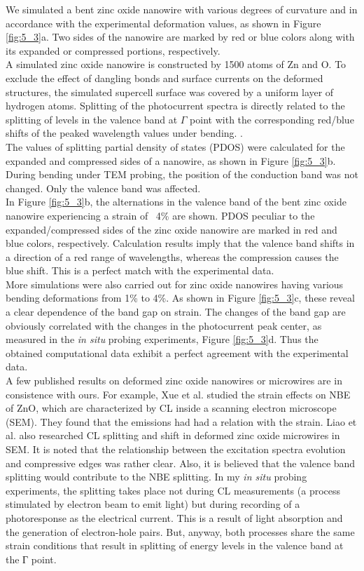 We simulated a bent zinc oxide nanowire with various degrees of curvature and in accordance with the experimental deformation values, as shown in Figure \ref{fig:5_3}a.
Two sides of the nanowire are marked by red or blue colors along with its expanded or compressed portions, respectively. \\
A simulated zinc oxide nanowire is constructed by 1500 atoms of Zn and O. 
To exclude the effect of dangling bonds and surface currents on the deformed structures, the simulated supercell surface was covered by a uniform layer of hydrogen atoms. 
Splitting of the photocurrent spectra is directly related to the splitting of levels in the valence band at $\Gamma$ point with the corresponding red/blue shifts of the peaked wavelength values under bending. .\cite{Liao2012} \\
The values of splitting partial density of states (PDOS) were calculated for the expanded and compressed sides of a nanowire, as shown in Figure \ref{fig:5_3}b. 
During bending under TEM probing, the position of the conduction band was not changed. 
Only the valence band was affected. \\
In Figure \ref{fig:5_3}b, the alternations in the valence band of the bent zinc oxide nanowire experiencing a strain of ~4\% are shown. 
PDOS peculiar to the expanded/compressed sides of the zinc oxide nanowire are marked in red and blue colors, respectively. 
Calculation results imply that the valence band shifts in a direction of a red range of wavelengths, whereas the compression causes the blue shift. 
This is a perfect match with the experimental data. \\
More simulations were also carried out for zinc oxide nanowires having various bending deformations from 1\% to 4\%. 
As shown in Figure \ref{fig:5_3}c, these reveal a clear dependence of the band gap on strain.  
The changes of the band gap are obviously correlated with the changes in the photocurrent peak center, as measured in the {\em in situ} probing experiments, Figure \ref{fig:5_3}d. 
Thus the obtained computational data exhibit a perfect agreement with the experimental data. \\

A few published results on deformed zinc oxide nanowires or microwires are in consistence with ours. 
For example, Xue et al. studied the strain effects on NBE of ZnO, which are characterized by CL inside a scanning electron microscope (SEM). They found that the emissions had had a relation with the strain.\cite{G.2010}
Liao et al. also researched CL splitting and shift in deformed zinc oxide microwires in SEM. It is noted that the relationship between the excitation spectra evolution and compressive edges was rather clear. Also, it is believed that the valence band splitting would contribute to the NBE splitting.\cite{Moreira2009} 
In my {\em in situ} probing experiments, the splitting takes place not during CL measurements (a process stimulated by electron beam to emit light) but during recording of a photoresponse as the electrical current. 
This is a result of light absorption and the generation of electron-hole pairs.
But, anyway, both processes share the same strain conditions that result in splitting of energy levels in the valence band at the Г point. 

